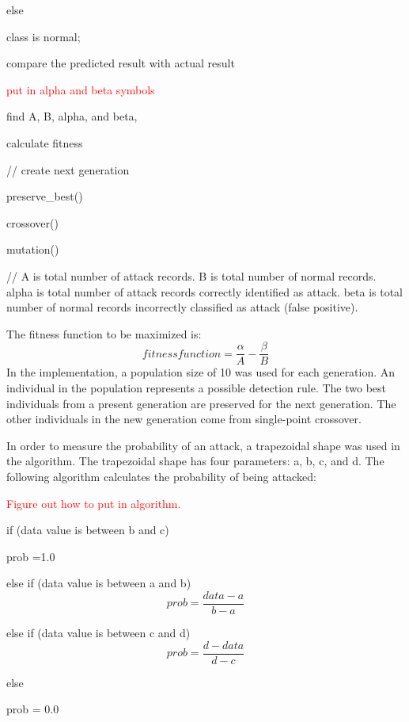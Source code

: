 \documentclass{sig-alternate}
\newcommand{\mycomment}[1]{\textcolor{red}{#1}}
\begin{document}
      else

         class is normal;


      compare the predicted result with actual result

\mycomment{put in alpha and beta symbols}

      find A, B, alpha, and beta,


   calculate fitness

   // create next generation

   preserve\_best()

   crossover()

   mutation()


// A is total number of attack records. B is total number of normal records. alpha is total number of attack records correctly identified as attack. beta is total number of normal records incorrectly classified as attack (false positive).




The fitness function to be maximized is:
\begin{equation*}
fitness function = \frac{\alpha}{A} - \frac{\beta}{B}
\end{equation*}
In the implementation, a population size of 10 was used for each generation. An individual in the population represents a possible detection rule. The two best individuals from a present generation are preserved for the next generation. The other individuals in the new generation come from single-point crossover.



In order to measure the probability of an attack, a trapezoidal shape was used in the algorithm. The trapezoidal shape has four parameters: a, b, c, and d. The following algorithm calculates the probability of being attacked:

\mycomment{Figure out how to put in algorithm.}

if (data value is between b and c)

   prob =1.0
   
else if (data value is between a and b)
\begin{equation*}
   prob = \frac{data - a}{b-a}
\end{equation*}

else if (data value is between c and d)
\begin{equation*}
   prob = \frac{d-data}{d-c}
\end{equation*}

else

   prob = 0.0
\end{document}

